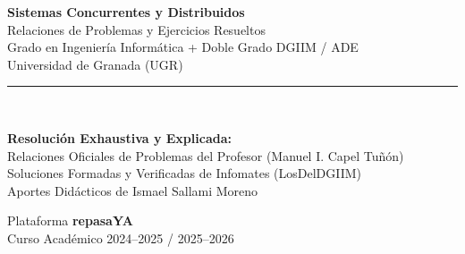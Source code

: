 \documentclass[11pt,a4paper,twoside,openright]{report}
\begin{document}
\begin{titlepage}
    \centering
    \vspace*{1.5cm}
    
    {\Huge\bfseries\color{scdDarkBlue}\textsf{Sistemas Concurrentes y Distribuidos}}\\[0.8cm]
    {\Large\textsf{Relaciones de Problemas y Ejercicios Resueltos}}\\[0.4cm]
    {\large\textsf{Grado en Ingeniería Informática + Doble Grado DGIIM / ADE}}\\[0.2cm]
    {\normalsize\textsf{Universidad de Granada (UGR)}}\\[1.5cm]
    
    \rule{0.8\textwidth}{1.5pt}\\[2.5cm]
    
    \begin{tcolorbox}[
        colback=scdLightAccent,
        colframe=scdAccent,
        width=0.85\textwidth,
        arc=4pt,
        halign=center
    ]
        \large\textbf{\color{scdDarkBlue}Resolución Exhaustiva y Explicada:}\\[6pt]
        \normalsize
        Relaciones Oficiales de Problemas del Profesor (Manuel I. Capel Tuñón)\\[2pt]
        Soluciones Formadas y Verificadas de Infomates (LosDelDGIIM)\\[2pt]
        Aportes Didácticos de Ismael Sallami Moreno
    \end{tcolorbox}
    
    \vfill
    
    {\large\textsf{Plataforma \textbf{repasaYA}}}\\[0.2cm]
    {\small\textsf{Curso Académico 2024--2025 / 2025--2026}}\\[0.8cm]
\end{titlepage}

\tableofcontents
\newpage



\end{document}
